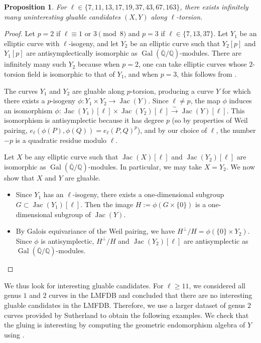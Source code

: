 \documentclass{amsproc}
\numberwithin{equation}{section}
\newtheorem{proposition}[equation]{Proposition}
\theoremstyle{definition}
\theoremstyle{remark}
\DeclareMathOperator{\Jac}{Jac}
\DeclareMathOperator{\Gal}{Gal}
\newcommand{\QQ}{\mathbb Q}
\newcommand{\Qbar}{\overline{\QQ}}
\newcommand{\GalQ}{\Gal(\Qbar/\QQ)}
\begin{document}
\begin{proposition}
    \label{prop:unintersting_gluing}
    For $\ell\in\{7,11,13,17,19,37,43,67,163\}$, 
    there exists infinitely many uninteresting gluable candidates $(X,Y)$ along $\ell$-torsion.
\end{proposition}
\begin{proof}
    Let $p=2$ if $\ell\equiv 1\text{ or }3\pmod 8$ and $p=3$ if $\ell \in \{7, 13, 37\}$.
    Let $Y_1$ be an elliptic curve with $\ell$-isogeny,
    and let $Y_2$ be an elliptic curve such that $Y_2[p]$ and $Y_1[p]$ are antisymplectically isomorphic as $\GalQ$-modules.
    There are infinitely many such $Y_2$ because
    when $p=2$, one can take elliptic curves
    whose $2$-torsion field is isomorphic to that of $Y_1$,
    and when $p=3$, this follows from \cite[\S 13]{ec_hessian}.
    
    The curves $Y_1$ and $Y_2$ are gluable along $p$-torsion, producing a curve $Y$ 
    for which there exists a $p$-isogeny 
    $\phi : Y_1\times Y_2\to \Jac(Y)$.
    Since $\ell\neq p$, the map $\phi$ induces an isomorphism
    $\phi : \Jac(Y_1)[\ell]\times \Jac(Y_2)[\ell] \stackrel\sim\to \Jac(Y)[\ell]$. This isomorphism is antisymplectic because 
    it has degree $p$ (so by properties of Weil pairing,
    $e_\ell(\phi(P),\phi(Q)) = e_\ell(P,Q)^p$), and by our choice of $\ell$, the number $-p$ is a quadratic residue modulo $\ell$.

Let $X$ be any elliptic curve such that $\Jac(X)[\ell]$ and $\Jac(Y_2)[\ell]$ are isomorphic as $\GalQ$-modules.
In particular, we may take $X=Y_2$.
We now show that $X$ and $Y$ are gluable.
\begin{itemize}
\item Since $Y_1$ has an $\ell$-isogeny, there exists a one-dimensional subgroup $G\subset \Jac(Y_1)[\ell]$.
Then the image $H := \phi(G\times\{0\})$ is a one-dimensional subgroup of $\Jac(Y)$.
\item By Galois equivariance of the Weil pairing, we have $H^\perp/H = \phi(\{0\}\times Y_2)$. Since $\phi$ is antisymplectic, $H^\perp/H$ and $\Jac(Y_2)[\ell]$ are antisymplectic as $\GalQ$-modules. \qedhere
\end{itemize}
\end{proof}
We thus look for interesting gluable candidates. For $\ell\geq 11$, we considered all genus $1$ and $2$ curves in the LMFDB and concluded that there are no interesting gluable candidates in the LMFDB. 
Therefore, we use a larger dataset of genus $2$ curves provided by Sutherland \cite{genus2_extended_db} to obtain the following examples. We check that the gluing is interesting by computing the geometric endomorphism algebra of $Y$ using \cite{endomorphism_ring}.
\end{document}
